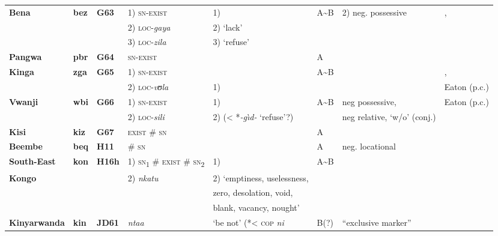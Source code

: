 \documentclass[output=paper]{langsci/langscibook}
\begin{document}
\begin{sidewaystable}[p]%
\begin{scriptsize}
\begin{tabularx}{\textwidth}{llllllll}
\lsptoprule
\textbf{Bena}	&\textbf{bez}	&\textbf{G63}	&1) \textsc{sn-exist}&1) \textendash						&A{\textasciitilde}B&2) neg. possessive						&\citet{Morrison2011},\\
				&				&				&2) \textsc{loc}-\textit{gaya}&2) `lack'						&		&												&\citet{Eaton2015a}\\
				&				&				&3) \textsc{loc}-\textit{zila}&3) `refuse'\\\midrule
\textbf{Pangwa}	&\textbf{pbr}	&\textbf{G64}	&\textsc{sn-exist}&\textendash								&A{}	&												&\citet{Stirnimann1983}\\\midrule
\textbf{Kinga} 	&\textbf{zga}	&\textbf{G65} 	&1) \textsc{sn-exist}&\textendash							&A{\textasciitilde}B&										&\citet{Wolff1905},\\
				&				&				&2) \textsc{loc}-\textit{vʊla}&1) \textendash					&		&												&Eaton (p.c.)\\\midrule
\textbf{Vwanji} 	&\textbf{wbi}	&\textbf{G66} 	&1) \textsc{sn-exist}&1) \textendash						&A{\textasciitilde}B&neg possessive,						&Eaton (p.c.)\\
				&				&				&2) \textsc{loc}-\textit{sili}&2) (< *\textit{-g{\`\i}d-} `refuse'?)&		&neg relative, `w/o' (conj.)\\\midrule
\textbf{Kisi}		&\textbf{kiz}		&\textbf{G67}	&\textsc{exist \# sn}&\textendash							&A{}	&												&\citet{Ngonyani2011}\\\midrule
\textbf{Beembe} 	&\textbf{beq}	&\textbf{H11}	&\# \textsc{sn}	&\textendash								&A{}	&neg. locational 									&\citet{Nsayi1984}\\\midrule
\textbf{South-East}&\textbf{kon}	&\textbf{H16h}	&1) \textsc{sn}\textsubscript{1} \# \textsc{exist} \# \textsc{sn}\textsubscript{2}&1) \textendash	&A{\textasciitilde}B&		&\citet{Bentley1887}\\
\textbf{Kongo}	&				&				&2) \textit{nkatu}									&2) `emptiness, uselessness,\\
				&				&				&												&zero, desolation, void,\\
				&				&				&												&blank, vacancy, nought'\\\midrule
\textbf{Kinyarwanda}&\textbf{kin}	&\textbf{JD61}	&\textit{ntaa} 	&`be not' (*< \textsc{cop} \textit{ni}		&B(?) 	&``exclusive marker''								&\citet{Kimenyi1980}\\

\end{tabularx}
\end{scriptsize}
\end{sidewaystable}
\end{document}
